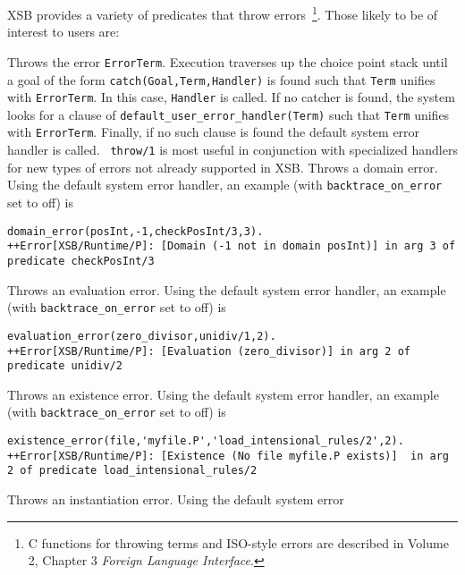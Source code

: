 XSB provides a variety of predicates that throw errors~\footnote{C
  functions for throwing terms and ISO-style errors are described in
  Volume 2, Chapter 3 {\em Foreign Language Interface}.}. Those likely
to be of interest to users are:
\begin{description}
%
Throws the error {\tt ErrorTerm}.  Execution traverses up the choice
point stack until a goal of the form {\tt catch(Goal,Term,Handler)} is
found such that {\tt Term} unifies with {\tt ErrorTerm}.  In this
case, {\tt Handler} is called.  If no catcher is found, the system
looks for a clause of {\tt default\_user\_error\_handler(Term)} such
that {\tt Term} unifies with {\tt ErrorTerm}.  Finally, if no such
clause is found the default system error handler is called.  {\tt
  throw/1} is most useful in conjunction with specialized handlers for
new types of errors not already supported in XSB.
%
Throws a domain error.  Using the default system error handler, an
example (with {\tt backtrace\_on\_error} set to off) is {\small
\begin{verbatim}
domain_error(posInt,-1,checkPosInt/3,3).
++Error[XSB/Runtime/P]: [Domain (-1 not in domain posInt)] in arg 3 of predicate checkPosInt/3
\end{verbatim} }
%
Throws an evaluation error.  Using the default system error handler, an
example (with {\tt backtrace\_on\_error} set to off) is {\small
\begin{verbatim}
evaluation_error(zero_divisor,unidiv/1,2).
++Error[XSB/Runtime/P]: [Evaluation (zero_divisor)] in arg 2 of predicate unidiv/2
\end{verbatim} }
%
Throws an existence error.  Using the default system error
handler, an example (with {\tt backtrace\_on\_error} set to off) is 
{\small 
\begin{verbatim}
existence_error(file,'myfile.P','load_intensional_rules/2',2).
++Error[XSB/Runtime/P]: [Existence (No file myfile.P exists)]  in arg 2 of predicate load_intensional_rules/2
\end{verbatim}
}
%
Throws an instantiation error.  Using the default system error

\end{description}
